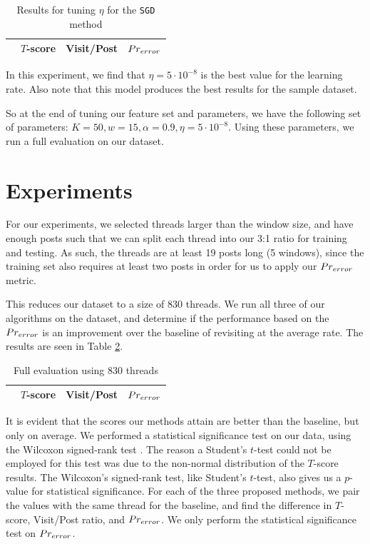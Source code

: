 \begin{table}
	\footnotesize
\begin{center}
\begin{tabular}{| l | c | c | c |}
\hline
& $T$-score			   &	Visit/Post & 	$Pr_{error}$\\
\hline
	
\hline
\end{tabular}
\end{center}
\caption{Results for tuning $\eta$ for the \texttt{SGD}
method}\label{tbl:par_tune_learning}
\end{table}

In this experiment, we find that $\eta=5\cdot10^{-8}$ is the best value for the 
learning rate. Also note that this model produces the best results for the 
sample dataset.


So at the end of tuning our feature set and parameters, we have the following 
set of parameters: $K = 50, w = 15, \alpha = 0.9, \eta = 5\cdot10^{-8}$. Using 
these parameters, we run a full evaluation on our dataset.

\section{Experiments}
For our experiments, we selected threads larger than the window size, and have 
enough posts such that we can split each thread into our 3:1 ratio for training 
and testing. As such, the threads are at least 19 posts long (5 windows), since 
the training set also requires at least two posts in order for us to apply our 
$Pr_{error}$ metric.

This reduces our dataset to a size of 830 threads. We run all three of our 
algorithms on the dataset, and determine if the performance based on the 
$Pr_{error}$ is an improvement over the baseline of revisiting at the average 
rate. The results are seen in Table \ref{tbl:full_eval}.
\begin{table}
	\footnotesize
\begin{center}
\begin{tabular}{| l | c | c | c |}
\hline
& $T$-score			   &	Visit/Post & 	$Pr_{error}$\\
\hline
	
\hline
\end{tabular}
\end{center}
\caption{Full evaluation using 830 threads}\label{tbl:full_eval}
\end{table}

It is evident that the scores our methods attain are better than the baseline, 
but only on average. We performed a statistical significance test on our data, 
using the Wilcoxon signed-rank test \cite{wilcoxon1945}. The reason a Student's 
$t$-test could not be employed for this test was due to the non-normal 
distribution of the $T$-score results. The Wilcoxon's signed-rank test, like 
Student's $t$-test, also gives us a $p$-value for statistical significance. For 
each of the three proposed methods, we pair the values with the same thread for 
the baseline, and find the difference in $T$-score, Visit/Post ratio, and 
$Pr_{error}$. We only perform the statistical significance test on $Pr_{error}$.

